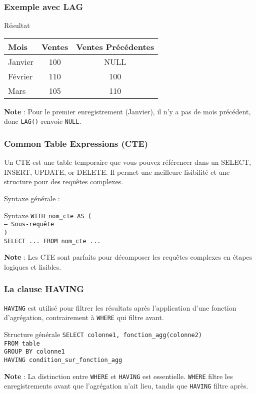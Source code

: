 \begin{frame}
  \frametitle{Exemple avec LAG}

  \begin{exampleblock}{Résultat}
    \begin{tabular}{l|c|c}
      \textbf{Mois} & \textbf{Ventes} & \textbf{Ventes Précédentes} \\
      \hline
      Janvier & 100 & NULL \\
      Février & 110 & 100 \\
      Mars & 105 & 110 \\
    \end{tabular}
  \end{exampleblock}

  \textbf{Note} : Pour le premier enregistrement (Janvier), il n'y a pas de mois précédent, donc \texttt{LAG()} renvoie \texttt{NULL}.
\end{frame}

\begin{frame}
  \frametitle{Common Table Expressions (CTE)}

  Un CTE est une table temporaire que vous pouvez référencer dans un SELECT, INSERT, UPDATE, or DELETE. Il permet une meilleure lisibilité et une structure pour des requêtes complexes.

  Syntaxe générale :
  \begin{block}{Syntaxe}
    \texttt{WITH nom\_cte AS ( \\
    \quad -- Sous-requête \\
    ) \\
    SELECT ... FROM nom\_cte ...}
  \end{block}

  \textbf{Note} : Les CTE sont parfaits pour décomposer les requêtes complexes en étapes logiques et lisibles.

\end{frame}

\begin{frame}
  \frametitle{La clause HAVING}

  \texttt{HAVING} est utilisé pour filtrer les résultats après l'application d'une fonction d'agrégation, contrairement à \texttt{WHERE} qui filtre avant.

  \begin{block}{Structure générale}
    \texttt{SELECT colonne1, fonction\_agg(colonne2) \\
    FROM table \\
    GROUP BY colonne1 \\
    HAVING condition\_sur\_fonction\_agg}
  \end{block}

  \textbf{Note} : La distinction entre \texttt{WHERE} et \texttt{HAVING} est essentielle. \texttt{WHERE} filtre les enregistrements avant que l'agrégation n'ait lieu, tandis que \texttt{HAVING} filtre après.

\end{frame}

